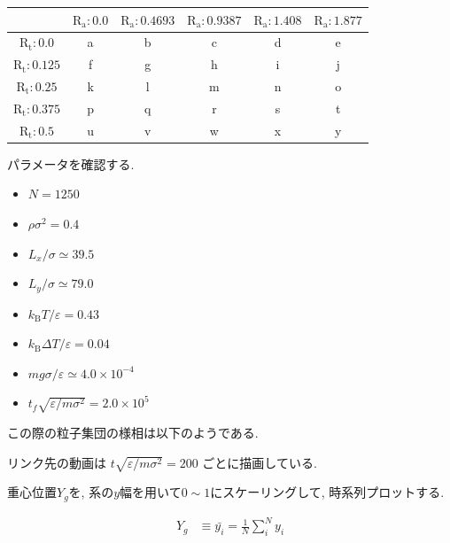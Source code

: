 \begin{center}
\begin{tabular}{|c|c|c|c|c|c|} \hline
        & $\text{R}_\text{a}:0.0$ & $\text{R}_\text{a}:0.4693$ & $\text{R}_\text{a}:0.9387$ & $\text{R}_\text{a}:1.408$ & $\text{R}_\text{a}:1.877$ \\ \hline
  $\text{R}_\text{t}:0.0$ & a      & b      & c      & d      & e     \\ \hline
  $\text{R}_\text{t}:0.125$ & f      & g      & h      & i      & j     \\ \hline
  $\text{R}_\text{t}:0.25$ & k      & l      & m      & n      & o     \\ \hline
  $\text{R}_\text{t}:0.375$ & p      & q      & r      & s      & t     \\ \hline
  $\text{R}_\text{t}:0.5$ & u      & v      & w      & x      & y     \\ \hline
\end{tabular}
\end{center}

\vspace{1\baselineskip}

パラメータを確認する.

\begin{itemize}
  \item $N = 1250$
  \item $\rho {\sigma}^2 = 0.4$
  \item $L_x / \sigma \simeq 39.5$
  \item $L_y / \sigma \simeq 79.0$
  \item $k_{\text{B}} T / \varepsilon = 0.43$
  \item $k_{\text{B}} \Delta T / \varepsilon = 0.04$
  \item $mg\sigma/\varepsilon \simeq 4.0 \times 10^{-4}$
  \item $t_f \sqrt{\varepsilon / m \sigma^2} = 2.0 \times 10^{5}$
\end{itemize}

この際の粒子集団の様相は以下のようである.

リンク先の動画は $t \sqrt{\varepsilon / m \sigma^2} = 200$ ごとに描画している. 



重心位置$Y_g$を, 系の$y$幅を用いて$0\sim 1$にスケーリングして, 時系列プロットする.

\begin{align}
  Y_g &\equiv \bar{y_i} = \frac{1}{N} \sum_{i}^{N} y_i
\end{align}

